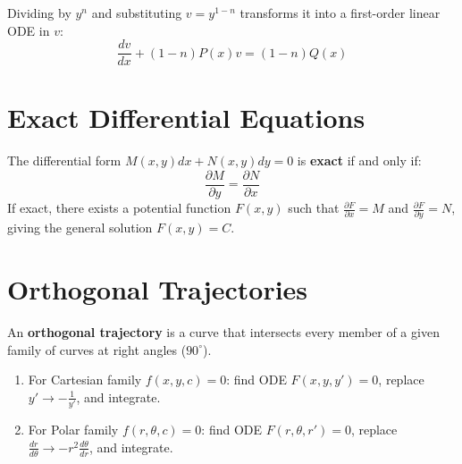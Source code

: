 \documentclass[11pt, a4paper, openany, oneside]{book}
\begin{document}
Dividing by $y^n$ and substituting $v = y^{1-n}$ transforms it into a first-order linear ODE in $v$:
\begin{equation}
    \frac{dv}{dx} + (1-n)P(x)v = (1-n)Q(x)
\end{equation}

\section{Exact Differential Equations}

\begin{theorembox}
The differential form $M(x,y)dx + N(x,y)dy = 0$ is \textbf{exact} if and only if:
\begin{equation}
    \frac{\partial M}{\partial y} = \frac{\partial N}{\partial x}
\end{equation}
If exact, there exists a potential function $F(x,y)$ such that $\frac{\partial F}{\partial x} = M$ and $\frac{\partial F}{\partial y} = N$, giving the general solution $F(x,y) = C$.
\end{theorembox}

\section{Orthogonal Trajectories}

An \textbf{orthogonal trajectory} is a curve that intersects every member of a given family of curves at right angles ($90^\circ$).

\begin{summarybox}
\begin{enumerate}[leftmargin=0.6cm]
\item For Cartesian family $f(x,y,c) = 0$: find ODE $F(x,y,y') = 0$, replace $y' \to -\frac{1}{y'}$, and integrate.
\item For Polar family $f(r,\theta,c) = 0$: find ODE $F(r,\theta,r') = 0$, replace $\frac{dr}{d\theta} \to -r^2 \frac{d\theta}{dr}$, and integrate.
\end{enumerate}
\end{summarybox}
\end{document}
